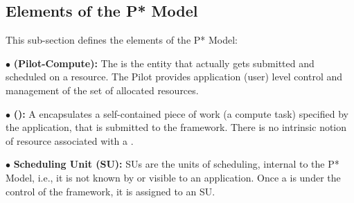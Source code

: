 \documentclass[conference]{IEEEtran}
\begin{document}


%

\noindent 
\subsection{Elements of the P* Model}

\noindent This sub-section defines the elements of the P* Model:

\noindent$\bullet$ \textbf{\pilot (Pilot-Compute):} The \pilot is the
entity that actually gets submitted and scheduled on a resource.  The
Pilot provides
application (user) level control and management of the set of
allocated resources.


\noindent$\bullet$ \textbf{\computeunit  (\cu):} A \cu  encapsulates a 
  self-contained piece of work (a compute task) specified by the application, that is
  submitted to the \pilotjob framework. There is no intrinsic notion
  of resource associated with a \cu.

\noindent$\bullet$ \textbf{Scheduling Unit (SU):} SUs are the units of 
  scheduling, internal to the P* Model, i.e., it is not known by or
  visible to an application. Once a \cu is
  under the control of the \pilotjob framework, it is assigned
  to an SU.
\end{document}
